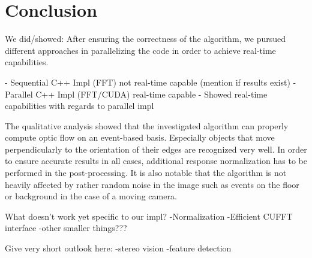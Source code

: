 \documentclass[a4paper,twoside, openright,12pt]{report}
\begin{document}








\chapter{Conclusion}

We did/showed:
After ensuring the correctness of the algorithm, we pursued different approaches in parallelizing the code in order to achieve real-time capabilities.

- Sequential C++ Impl (FFT) not real-time capable (mention if results exist)
- Parallel C++ Impl (FFT/CUDA) real-time capable
- Showed real-time capabilities with regards to parallel impl

The qualitative analysis showed that the investigated algorithm can properly compute optic flow on an event-based basis.
Especially objects that move perpendicularly to the orientation of their edges are recognized very well.
In order to ensure accurate results in all cases, additional response normalization has to be performed in the post-processing.
It is also notable that the algorithm is not heavily affected by rather random noise in the image such as events on the floor or background in the case of a moving camera.

What doesn't work yet specific to our impl? 
-Normalization
-Efficient CUFFT interface
-other smaller things???




Give very short outlook here:
-stereo vision
-feature detection



\cleardoublepage
{}
\listoffigures 	 %


\cleardoublepage
{}


\end{document}
